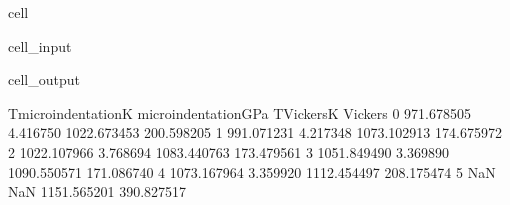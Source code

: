 \documentclass[letterpaper,10pt,english]{jupyterBook}
\begin{document}
\begin{sphinxuseclass}{cell}
\begin{sphinxVerbatimInput}
\begin{sphinxuseclass}{cell_input}
\begin{sphinxVerbatim}[commandchars=\\\{\}]
					  
					  
					
					
					 \PYG{p}{,}    \PYGZbs{}
					    \PYGZbs{}
					       
				\end{sphinxVerbatim}
				
		\end{sphinxuseclass}\end{sphinxVerbatimInput}
		\begin{sphinxVerbatimOutput}
			
			\begin{sphinxuseclass}{cell_output}
				\begin{sphinxVerbatim}[commandchars=\\\{\}]
					T\PYGZus{}microindentationK  microindentationGPa   T\PYGZus{}VickersK     Vickers
					0           971.678505             4.416750  1022.673453  200.598205
					1           991.071231             4.217348  1073.102913  174.675972
					2          1022.107966             3.768694  1083.440763  173.479561
					3          1051.849490             3.369890  1090.550571  171.086740
					4          1073.167964             3.359920  1112.454497  208.175474
					5                  NaN                  NaN  1151.565201  390.827517
				\end{sphinxVerbatim}
				
				\noindent{}
				
		\end{sphinxuseclass}\end{sphinxVerbatimOutput}
		
	\end{sphinxuseclass}
\end{document}
